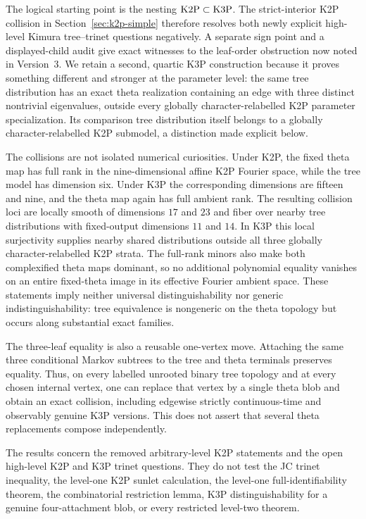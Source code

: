 \documentclass[11pt]{article}
\theoremstyle{remark}\newtheorem{remark}[theorem]{Remark}
\begin{document}
The logical starting point is the nesting $\mathrm{K2P}\subset\mathrm{K3P}$. The strict-interior K2P collision in Section~\ref{sec:k2p-simple} therefore resolves both newly explicit high-level Kimura tree--trinet questions negatively. A separate sign point and a displayed-child audit give exact witnesses to the leaf-order obstruction now noted in Version~3. We retain a second, quartic K3P construction because it proves something different and stronger at the parameter level: the same tree distribution has an exact theta realization containing an edge with three distinct nontrivial eigenvalues, outside every globally character-relabelled K2P parameter specialization. Its comparison tree distribution itself belongs to a globally character-relabelled K2P submodel, a distinction made explicit below.

The collisions are not isolated numerical curiosities. Under K2P, the fixed theta map has full rank in the nine-dimensional affine K2P Fourier space, while the tree model has dimension six. Under K3P the corresponding dimensions are fifteen and nine, and the theta map again has full ambient rank. The resulting collision loci are locally smooth of dimensions $17$ and $23$ and fiber over nearby tree distributions with fixed-output dimensions $11$ and $14$. In K3P this local surjectivity supplies nearby shared distributions outside all three globally character-relabelled K2P strata. The full-rank minors also make both complexified theta maps dominant, so no additional polynomial equality vanishes on an entire fixed-theta image in its effective Fourier ambient space. These statements imply neither universal distinguishability nor generic indistinguishability: tree equivalence is nongeneric on the theta topology but occurs along substantial exact families.

The three-leaf equality is also a reusable one-vertex move. Attaching the same three conditional Markov subtrees to the tree and theta terminals preserves equality. Thus, on every labelled unrooted binary tree topology and at every chosen internal vertex, one can replace that vertex by a single theta blob and obtain an exact collision, including edgewise strictly continuous-time and observably genuine K3P versions. This does not assert that several theta replacements compose independently.

The results concern the removed arbitrary-level K2P statements and the open high-level K2P and K3P trinet questions. They do not test the JC trinet inequality, the level-one K2P sunlet calculation, the level-one full-identifiability theorem, the combinatorial restriction lemma, K3P distinguishability for a genuine four-attachment blob, or every restricted level-two theorem.
\end{document}
